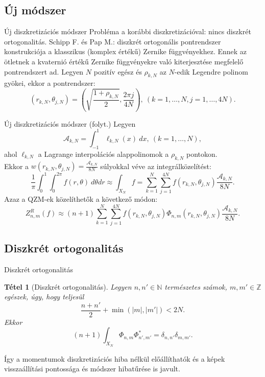 \documentclass{beamer}
\newcommand{\N}{\mathbb{N}}
\newcommand{\Z}{\mathbb{Z}}
\def\N{{\mathbb N}}
\def\Z{{\mathbb Z}}
\newtheorem{tetel}{Tétel}
\begin{document}
\subsection{Új módszer}
\begin{frame}{Új diszkretizációs módszer}
    Probléma a korábbi diszkretizációval: nincs diszkrét ortogonalitás.
    \vskip 5mm
    Schipp F. és Pap M.: diszkrét ortogonális pontrendszer konstrukciója a klasszikus (komplex értékű) Zernike függvényekhez.
    \vskip 3mm
    Ennek az ötletnek a kvaternió értékű Zernike függvényekre való kiterjesztése megfelelő pontrendszert ad.
    \vskip 3mm
    Legyen $N$ pozitív egész és $\rho_{k,N}$ az $N$-edik Legendre polinom gyökei, ekkor a pontrendszer:
    $$(r_{k,N}, \theta_{j,N}) = \left(\sqrt{\frac{1+\rho_{k,N}}{2}} , \frac{2\pi j}{4N} \right), \ (k=1,\ldots,N,j=1,\ldots,4N).$$
    
\end{frame}

\begin{frame}{Új diszkretizációs módszer (folyt.)}
    \vskip 5mm
    Legyen $$\mathcal{A}_{k,N} = \int_{-1}^{1} \ell_{k,N}(x)\ dx, \ (k=1,\ldots,N),$$ ahol $\ell_{k,N}$ a Lagrange interpolációs alappolinomok a $\rho_{k,N}$ pontokon.\\
    Ekkor a $w(r_{k,N},\theta_{j,N}) = \frac{\mathcal{A}_{k,N}}{8N}$ súlyokkal véve az integrálközelítést:
    $$\frac{1}{\pi} \int_{0}^1 \int_0^{2\pi} f(r,\theta)\ d\theta dr \approx \int_{X_N} f = \sum_{k=1}^{N} \sum_{j=1}^{4N} f(r_{k,N},\theta_{j,N}) \frac{\mathcal{A}_{k,N}}{8N}.$$
    Azaz a QZM-ek közelíthetők a következő módon:
    $$Z^R_{n,m}(f) \approx (n+1)\sum_{k=1}^{N}\sum_{j=1}^{4N}f(r_{k,N},\theta_{j,N})\Phi_{n,m}(r_{k,N},\theta_{j,N})\frac{\mathcal{A}_{k,N}}{8N}.$$

\end{frame}


\subsection{Diszkrét ortogonalitás}
\begin{frame}{Diszkrét ortogonalitás}
\begin{tetel}[Diszkrét ortogonalitás]
    Legyen $n, n' \in \N$ természetes számok, $m, m' \in \Z$ egészek, úgy, hogy teljesül $$\frac{n + n'}{2} + \min(|m|,|m'|) < 2N.$$
    Ekkor $$(n + 1)\int_{X_N}\Phi_{n,m}\Phi_{n',m'}^* = \delta_{n,n'}\delta_{m,m'}.$$
\end{tetel}
Így a momentumok diszkretizációs hiba nélkül előállíthatók és a képek visszaállítási pontossága és módszer hibatűrése is javult.
\end{frame}
\end{document}
